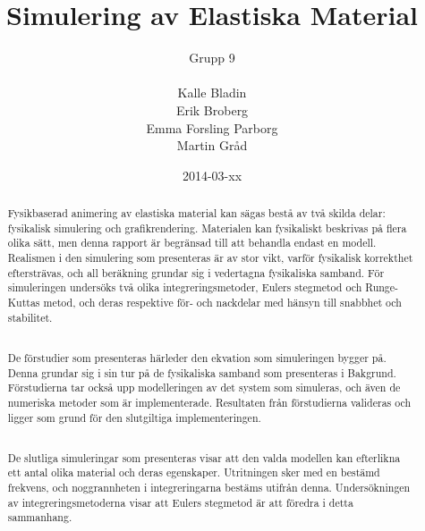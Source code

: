 \documentclass[a4paper,12pt,oneside,final,swedish]{extarticle}
\begin{document}
\author{Grupp 9\\\\Kalle Bladin\\Erik Broberg\\Emma Forsling Parborg\\Martin Gråd}
\title{Simulering av Elastiska Material}
\clearpage\maketitle %
\thispagestyle{empty}
\date{2014-03-xx}
\pagebreak




\begin{abstract}
\thispagestyle{empty}
\noindent Fysikbaserad animering av elastiska material kan sägas bestå av två skilda delar: fysikalisk simulering och grafikrendering. Materialen kan fysikaliskt beskrivas på flera olika sätt, men denna rapport är begränsad till att behandla endast en modell. Realismen i den simulering som presenteras är av stor vikt, varför fysikalisk korrekthet eftersträvas, och all beräkning grundar sig i vedertagna fysikaliska samband. För simuleringen undersöks två olika integreringsmetoder, Eulers stegmetod och Runge-Kuttas metod, och deras respektive för- och nackdelar med hänsyn till snabbhet och stabilitet.

\noindent \\De förstudier som presenteras härleder den ekvation som simuleringen bygger på. Denna grundar sig i sin tur på de fysikaliska samband som presenteras i Bakgrund. Förstudierna tar också upp modelleringen av det system som simuleras, och även de numeriska metoder som är implementerade. Resultaten från förstudierna valideras och ligger som grund för den slutgiltiga implementeringen.

\noindent \\De slutliga simuleringar som presenteras visar att den valda modellen kan efterlikna ett antal olika material och deras egenskaper. Utritningen sker med en bestämd frekvens, och noggrannheten i integreringarna bestäms utifrån denna. Undersökningen av integreringsmetoderna visar att Eulers stegmetod är att föredra i detta sammanhang.
\hfill
\end{abstract}
\pagebreak 

\tableofcontents  %
\listoffigures    %
\listoftables     %
\end{document}
